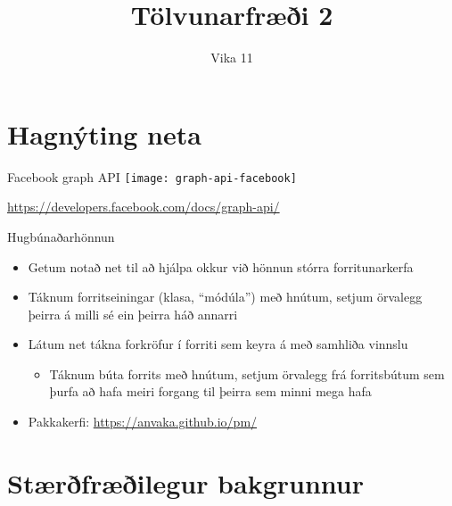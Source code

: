 \documentclass{beamer}
\title{Tölvunarfræði 2}
\subtitle{Vika 11}
\begin{document}
\begin{frame}
	\titlepage
\end{frame}

\section{Hagnýting neta}




\begin{frame}{Facebook graph API}
	\texttt{[image: graph-api-facebook]}

	\begin{center}
		\url{https://developers.facebook.com/docs/graph-api/}
	\end{center}
\end{frame}

\begin{frame}{Hugbúnaðarhönnun}
	\begin{itemize}
		\item Getum notað net til að hjálpa okkur við hönnun stórra forritunarkerfa
		\item Táknum forritseiningar (klasa, ``módúla'') með hnútum, setjum örvalegg þeirra á milli sé ein þeirra háð annarri
		\item Látum net tákna forkröfur í forriti sem keyra á með samhliða vinnslu
		      \begin{itemize}
			      \item Táknum búta forrits með hnútum, setjum örvalegg frá forritsbútum sem þurfa að hafa meiri forgang til þeirra sem minni mega hafa
		      \end{itemize}
		\item Pakkakerfi: \url{https://anvaka.github.io/pm/}
	\end{itemize}
\end{frame}


\section{Stærðfræðilegur bakgrunnur}
\end{document}
